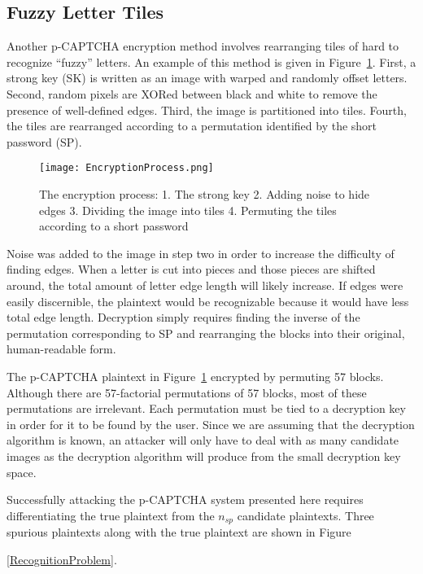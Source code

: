 \documentclass[12pt]{article}
\begin{document}
{%

\subsection*{Fuzzy Letter Tiles}
	Another p-CAPTCHA encryption method involves rearranging tiles of hard to recognize “fuzzy” letters. An example of this method is given in Figure~{\ref{EncryptionProcess}}. First, a strong key (SK) is written as an image with warped and randomly offset letters. Second, random pixels are XORed between black and white to remove the presence of well-defined edges. Third, the image is partitioned into tiles. Fourth, the tiles are rearranged according to a permutation identified by the short password (SP).

\begin{figure}
	\begin{center}
		\texttt{[image: EncryptionProcess.png]}
	\end{center}
	\caption{The encryption process: 1. The strong key 2. Adding noise to hide edges 3. Dividing the image into tiles 4. Permuting the tiles according to a short password}
\label{EncryptionProcess}
\end{figure}

Noise was added to the image in step two in order to increase the difficulty of finding edges. When a letter is cut into pieces and those pieces are shifted around, the total amount of letter edge length will likely increase. If edges were easily discernible, the plaintext would be recognizable because it would have less total edge length. Decryption simply requires finding the inverse of the permutation corresponding to SP and rearranging the blocks into their original, human-readable form.

The p-CAPTCHA plaintext in Figure~{\ref{EncryptionProcess}} encrypted by permuting 57 blocks. Although there are 57-factorial permutations of 57 blocks, most of these permutations are irrelevant. Each permutation must be tied to a decryption key in order for it to be found by the user. Since we are assuming that the decryption algorithm is known, an attacker will only have to deal with as many candidate images as the decryption algorithm will produce from the small decryption key space.

Successfully attacking the p-CAPTCHA system presented here requires differentiating the true plaintext from the $n_{sp}$ candidate plaintexts. Three spurious plaintexts along with the true plaintext are shown in Figure~{\ref{RecognitionProblem}.

}}
\end{document}
